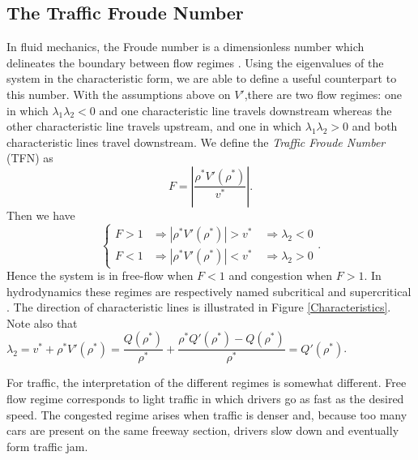 \documentclass[letterpaper, 10 pt, conference]{ieeeconf}  %
\begin{document}
\subsection{The Traffic Froude Number}
In fluid mechanics, the Froude number is a dimensionless number which delineates the boundary between flow regimes \cite{litrico2009modeling, Sturm}. Using the eigenvalues of the system in the characteristic form, we are able to define a useful counterpart to this number. 
With the assumptions above on $V'$,there are two flow regimes: one in which $\lambda_1 \lambda_2 < 0$ and one characteristic line travels downstream whereas the other characteristic line travels upstream, and one in which $\lambda_1 \lambda_2 > 0$ and both characteristic lines travel downstream. We define the \textit{Traffic Froude Number} (TFN) as
\begin{equation}
F = \left\lvert\dfrac{\rho^*V'( \rho^*)}{v^*}\right\rvert.
\end{equation}
Then we have
\begin{equation*}
\begin{cases}
F > 1 &\Rightarrow |\rho^*V'(\rho^*)| > v^* \quad \Rightarrow \lambda_2  <0 \\
F < 1 &\Rightarrow |\rho^*V'(\rho^*)| < v^* \quad \Rightarrow \lambda_2 > 0
\end{cases}.
\end{equation*}
Hence the system is in free-flow when $F<1$ and congestion when $F>1$. In hydrodynamics these regimes are respectively named subcritical and supercritical \cite{litrico2009modeling}. The direction of characteristic lines is illustrated in Figure \ref{Characteristics}. Note also that {\footnotesize$\lambda_2 = v^* + \rho^* V'( \rho^*) = \dfrac{Q(\rho^*)}{\rho^*} + \dfrac{\rho^*Q'(\rho^*)-Q(\rho^*)}{\rho^*} = Q'(\rho^*)$}.

For traffic, the interpretation of the different regimes is somewhat different. Free flow regime corresponds to light traffic in which drivers go as fast as the desired speed. The congested regime arises when traffic is denser and, because too many cars are present on the same freeway section, drivers slow down and eventually form traffic jam.
\end{document}

